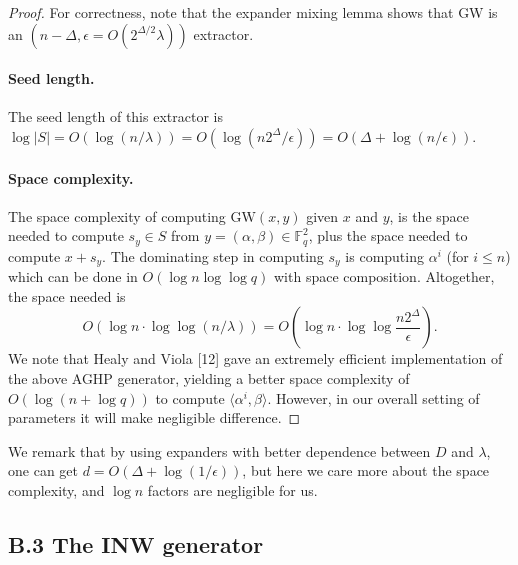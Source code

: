 \begin{proof}
For correctness, note that the expander mixing lemma shows that GW is an $(n-\Delta,\epsilon=O(2^{\Delta/2}\lambda))$ extractor.
\paragraph{Seed length.} The seed length of this extractor is $\log|S|=O(\log(n/\lambda))=O(\log(n2^\Delta/\epsilon))=O(\Delta+\log(n/\epsilon))$.
\paragraph{Space complexity.} The space complexity of computing $\mathrm{GW}(x,y)$ given $x$ and $y$, is the space needed to compute $s_y\in S$ from $y=(\alpha,\beta)\in\mathbb F_q^2$, plus the space needed to compute $x+s_y$. The dominating step in computing $s_y$ is computing $\alpha^i$ (for $i\le n$) which can be done in $O(\log n\log\log q)$ with space composition. Altogether, the space needed is
\[O(\log n\cdot\log\log(n/\lambda))=O\left(\log n\cdot\log\log\frac{n2^\Delta}\epsilon\right).\]
We note that Healy and Viola [12] gave an extremely efficient implementation of the above AGHP generator, yielding a better space complexity of $O(\log(n+\log q))$ to compute $\langle\alpha^i,\beta\rangle$. However, in our overall setting of parameters it will make negligible difference.
\end{proof}
We remark that by using expanders with better dependence between $D$ and $\lambda$, one can get $d=O(\Delta+\log(1/\epsilon))$, but here we care more about the space complexity, and $\log n$ factors are negligible for us.
\subsection*{B.3 The INW generator}
